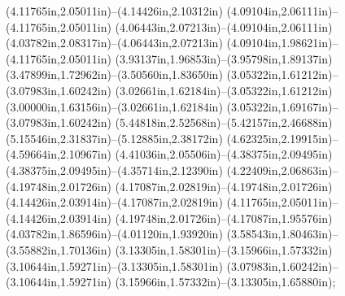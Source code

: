 (4.11765in,2.05011in)--(4.14426in,2.10312in) (4.09104in,2.06111in)--(4.11765in,2.05011in) (4.06443in,2.07213in)--(4.09104in,2.06111in) (4.03782in,2.08317in)--(4.06443in,2.07213in) (4.09104in,1.98621in)--(4.11765in,2.05011in) (3.93137in,1.96853in)--(3.95798in,1.89137in) (3.47899in,1.72962in)--(3.50560in,1.83650in) (3.05322in,1.61212in)--(3.07983in,1.60242in) (3.02661in,1.62184in)--(3.05322in,1.61212in) (3.00000in,1.63156in)--(3.02661in,1.62184in) (3.05322in,1.69167in)--(3.07983in,1.60242in) (5.44818in,2.52568in)--(5.42157in,2.46688in) (5.15546in,2.31837in)--(5.12885in,2.38172in) (4.62325in,2.19915in)--(4.59664in,2.10967in) (4.41036in,2.05506in)--(4.38375in,2.09495in) (4.38375in,2.09495in)--(4.35714in,2.12390in) (4.22409in,2.06863in)--(4.19748in,2.01726in) (4.17087in,2.02819in)--(4.19748in,2.01726in) (4.14426in,2.03914in)--(4.17087in,2.02819in) (4.11765in,2.05011in)--(4.14426in,2.03914in) (4.19748in,2.01726in)--(4.17087in,1.95576in) (4.03782in,1.86596in)--(4.01120in,1.93920in) (3.58543in,1.80463in)--(3.55882in,1.70136in) (3.13305in,1.58301in)--(3.15966in,1.57332in) (3.10644in,1.59271in)--(3.13305in,1.58301in) (3.07983in,1.60242in)--(3.10644in,1.59271in) (3.15966in,1.57332in)--(3.13305in,1.65880in);
